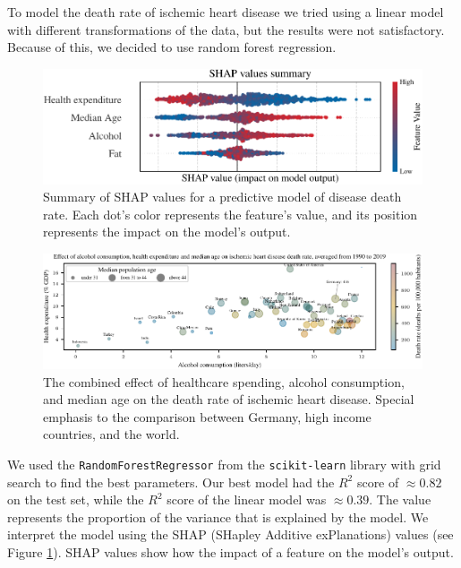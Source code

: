 
To model the death rate of ischemic heart disease we tried using a linear model with different transformations of the data, but the results were not satisfactory.
Because of this, we decided to use random forest regression. 
\begin{figure}[h]
    \vskip 0.2in
    \begin{center}
    \centerline{\includegraphics[width=\columnwidth]{fig/fig_shap_values_summary.pdf}}
    \caption{Summary of SHAP values for a predictive model of disease death rate. 
    Each dot's color represents the feature's value, and its position represents the impact on the model's output.}
    \label{shap_values}
    \end{center}
    \vskip -0.2in
\end{figure}

\begin{figure}[ht]
    \vskip 0.2in
    \centering
    \centerline{\includegraphics[]{fig/fig_bubble_plot_factors.pdf}}
    \caption{The combined effect of healthcare spending, alcohol consumption, and median age on the death rate of ischemic heart disease. Special 
        emphasis to the comparison between Germany, high income countries, and the world.}
    \label{bubble_plot_factors}
\end{figure}
We used the \texttt{RandomForestRegressor} from the \texttt{scikit-learn} library \citep{scikit-learn} with grid search to find the best parameters. 
Our best model had the $R^2$ score of $\approx0.82$ on the test set, while the $R^2$ score of the linear model was $\approx0.39$. The value represents the proportion of the variance that 
is explained by the model. We interpret the model using the SHAP (SHapley Additive exPlanations) values \citep{NIPS2017_7062} (see Figure \ref{shap_values}). SHAP values 
show how the impact of a feature on the model's output. 


